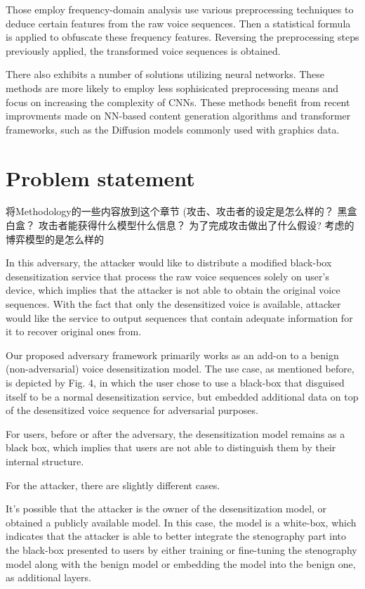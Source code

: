 \documentclass[journal]{IEEEtran} %
\begin{document}
\begin{CJK*}{UTF8}{gbsn}
Those employ frequency-domain analysis use various preprocessing techniques to deduce certain features from the raw voice sequences. Then a statistical formula is applied to obfuscate these frequency features. Reversing the preprocessing steps previously applied, the transformed voice sequences is obtained.

There also exhibits a number of solutions utilizing neural networks. These methods are more likely to employ less sophisicated preprocessing means and focus on increasing the complexity of CNNs. These methods benefit from recent improvments made on NN-based content generation algorithms and transformer frameworks, such as the Diffusion models commonly used with graphics data.

\section{Problem statement}
将Methodology的一些内容放到这个章节
(攻击、攻击者的设定是怎么样的？ 黑盒白盒？ 攻击者能获得什么模型什么信息？ 为了完成攻击做出了什么假设? 考虑的博弈模型的是怎么样的

In this adversary, the attacker would like to distribute a modified black-box desensitization service that process the raw voice sequences solely on user's device, which implies that the attacker is not able to obtain the original voice sequences. With the fact that only the desensitized voice is available, attacker would like the service to output sequences that contain adequate information for it to recover original ones from.

Our proposed adversary framework primarily works as an add-on to a benign (non-adversarial) voice desensitization model. The use case, as mentioned before, is depicted by Fig. 4, in which the user chose to use a black-box that disguised itself to be a normal desensitization service, but embedded additional data on top of the desensitized voice sequence for adversarial purposes.

For users, before or after the adversary, the desensitization model remains as a black box, which implies that users are not able to distinguish them by their internal structure.

For the attacker, there are slightly different cases.

It's possible that the attacker is the owner of the desensitization model, or obtained a publicly available model. In this case, the model is a white-box, which indicates that the attacker is able to better integrate the stenography part into the black-box presented to users by either training or fine-tuning the stenography model along with the benign model or embedding the model into the benign one, as additional layers.


\end{CJK*}
\end{document}
